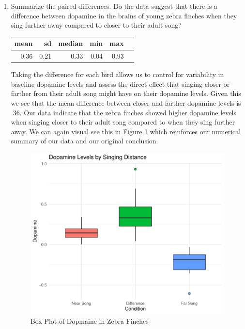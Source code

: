 \documentclass{article}\usepackage[]{graphicx}\usepackage[]{xcolor}
\begin{document}
\begin{enumerate}
\begin{enumerate}
   
  \item Summarize the paired differences. Do the data suggest
  that there is a difference between dopamine in the brains of
  young zebra finches when they sing further away compared to 
  closer to their adult song?
\begin{table}[ht]
\centering
\begin{tabular}{rrrrrr}
  \hline
mean & sd & median & min & max \\ 
  \hline
0.36 & 0.21 & 0.33 & 0.04 & 0.93 \\ 
   \hline
\end{tabular}
\end{table}

Taking the difference for each bird allows us to control for variability in baseline dopamine levels and assess the direct effect that singing closer or farther from their adult song might have on their dopamine levels. Given this we see that the mean difference between closer and farther dopamine levels is .36. Our data indicate that the zebra finches showed higher dopamine levels when singing closer to their adult song compared to when they sing further away. We can again visual see this in Figure \ref{plot1} which reinforces our numerical summary of our data and our original conclusion. 

  
  \begin{figure}[H]
  \begin{center}
  \includegraphics[scale=.8]{boxplot.finchdat.pdf}
  \caption{Box Plot of Dopmaine in Zebra Finches}
  \label{plot1}
  \end{center}
\end{figure}
  

\end{enumerate}
\end{enumerate}
\end{document}
